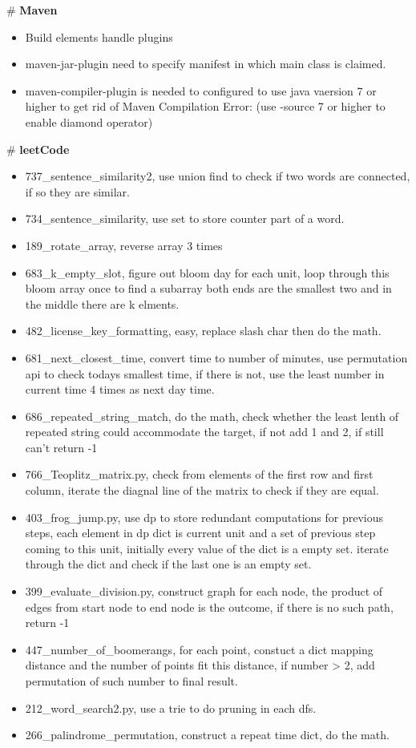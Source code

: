 \# \textbf{Maven}
\begin{itemize}
\item Build elements handle plugins
\item maven-jar-plugin need to specify manifest in which main class is claimed.
\item maven-compiler-plugin is needed to configured to use java vaersion 7 or higher to get rid of Maven Compilation Error: (use -source 7 or higher to enable diamond operator)
\end{itemize}
\# \textbf{leetCode}
\begin{itemize}
\item 737\_sentence\_similarity2, use union find to check if two words are connected, if so they are similar.
\item 734\_sentence\_similarity, use set to store counter part of a word.
\item 189\_rotate\_array, reverse array 3 times
\item 683\_k\_empty\_slot, figure out bloom day for each unit, loop through this bloom array once to find a subarray both ends are the smallest two and in the middle there are k elments.
\item 482\_license\_key\_formatting, easy, replace slash char then do the math.
\item 681\_next\_closest\_time, convert time to number of minutes, use permutation api to check todays smallest time, if there is not, use the least number in current time 4 times as next day time.
\item 686\_repeated\_string\_match, do the math, check whether the least lenth of repeated string could accommodate the target, if not add 1 and 2, if still can't return -1
\item 766\_Teoplitz\_matrix.py, check from elements of the first row and first column, iterate the diagnal line of the matrix to check if they are equal.
\item 403\_frog\_jump.py, use dp to store redundant computations for previous steps, each element in dp dict is current unit and a set of previous step coming to this unit, initially every value
  of the dict is a empty set. iterate through the dict and check if the last one is an empty set.
\item 399\_evaluate\_division.py, construct graph for each node, the product of edges from start node to end node is the outcome, if there is no such path, return -1
\item 447\_number\_of\_boomerangs, for each point, constuct a dict mapping distance and the number of points fit this distance, if number > 2, add permutation of such number to final result.
\item 212\_word\_search2.py, use a trie to do pruning in each dfs.
\item 266\_palindrome\_permutation, construct a repeat time dict, do the math.
\end{itemize}
